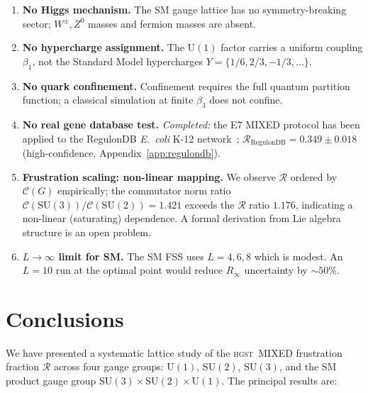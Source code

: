 \documentclass[12pt,a4paper]{article}
\newcommand{\R}{\mathcal{R}}           %
\newcommand{\hgst}{\textsc{hgst}}
\newcommand{\SU}[1]{\mathrm{SU}(#1)}
\newcommand{\UN}[1]{\mathrm{U}(#1)}
\newcommand{\SM}{\SU{3}\!\times\!\SU{2}\!\times\!\UN{1}}
\theoremstyle{plain}
\theoremstyle{definition}
\theoremstyle{remark}
\begin{document}
\begin{enumerate}
  \item \textbf{No Higgs mechanism.}
        The SM gauge lattice has no symmetry-breaking sector; $W^\pm,Z^0$ masses
        and fermion masses are absent.
  \item \textbf{No hypercharge assignment.}
        The $\UN{1}$ factor carries a uniform coupling $\beta_1$, not the
        Standard Model hypercharges $Y = \{1/6, 2/3, -1/3,\ldots\}$.
  \item \textbf{No quark confinement.}
        Confinement requires the full quantum partition function; a classical
        simulation at finite $\beta_3$ does not confine.
  \item \textbf{No real gene database test.}
        \textit{Completed:} the E7 MIXED protocol has been applied to the
        RegulonDB \textit{E.~coli} K-12 network~\citep{SantosZavaleta2019};
        $\R_\text{RegulonDB}=0.349\pm0.018$ (high-confidence, Appendix~\ref{app:regulondb}).
  \item \textbf{Frustration scaling: non-linear mapping.}
        We observe $\R$ ordered by $\mathcal{C}(G)$ empirically; the
        commutator norm ratio$\mathcal{C}(\SU{3})/\mathcal{C}(\SU{2})=1.421$
        exceeds the $\R$ ratio $1.176$, indicating a non-linear (saturating)
        dependence. A formal derivation from Lie algebra structure is an open problem.
  \item \textbf{$L\to\infty$ limit for SM.}
        The SM FSS uses $L=4,6,8$ which is modest.
        An $L=10$ run at the optimal point would reduce $R_\infty$ uncertainty
        by $\sim50\%$.
\end{enumerate}

\section{Conclusions}
\label{sec:conclusions}

We have presented a systematic lattice study of the \hgst\ MIXED frustration fraction
$\R$ across four gauge groups: $\UN{1}$, $\SU{2}$, $\SU{3}$, and the SM
product gauge group $\SM$.
The principal results are:
\end{document}
